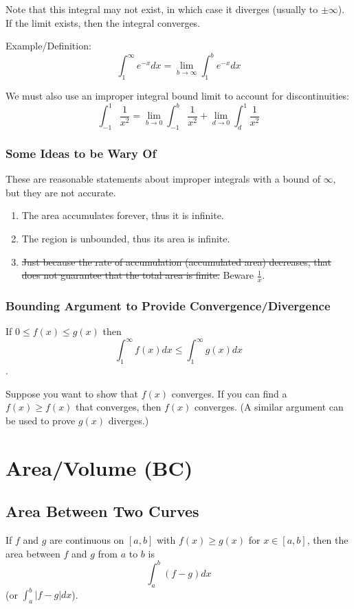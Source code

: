 \documentclass{article}
\begin{document}
Note that this integral may not exist, in which case it diverges (usually to $\pm \infty$). If the limit exists, then the integral converges.

Example/Definition:
$$\int_{1}^{\infty} e^{-x} dx = \lim_{b \to \infty} \int_{1}^{b} e^{-x} dx $$

We must also use an improper integral bound limit to account for discontinuities:
$$\int_{-1}^{1} \frac{1}{x^2} = \lim_{b \to 0} \int_{-1}^{b} \frac{1}{x^2} + \lim_{d \to 0} \int_{d}^{1} \frac{1}{x^2} $$

\subsubsection{Some Ideas to be Wary Of}
These are reasonable statements about improper integrals with a bound of $\infty$, but they are not accurate.

\begin{enumerate}
    \item The area accumulates forever, thus it is infinite.
    \item The region is unbounded, thus its area is infinite.
    \item \st{Just because the rate of accumulation (accumulated area) decreases, that does not guarantee that the total area is finite.} Beware $\frac{1}{x}$.
\end{enumerate}

\subsubsection{Bounding Argument to Provide Convergence/Divergence}
If $0 \le f(x) \le g(x)$ then $$\int_{1}^{\infty} f(x) dx \le \int_{1}^{\infty} g(x) dx$$.

Suppose you want to show that $f(x)$ converges. If you can find a $f(x) \ge f(x)$ that converges, then $f(x)$ converges. (A similar argument can be used to prove $g(x)$ diverges.)

\section{Area/Volume (BC)}
\subsection{Area Between Two Curves}
If $f$ and $g$ are continuous on $[a,b]$ with $f(x) \ge g(x)$ for $x \in [a,b]$, then the area between $f$ and $g$ from $a$ to $b$ is $$\int_{a}^{b} (f-g)dx$$ (or $\int_{a}^{b} |f-g| dx$).
\end{document}
